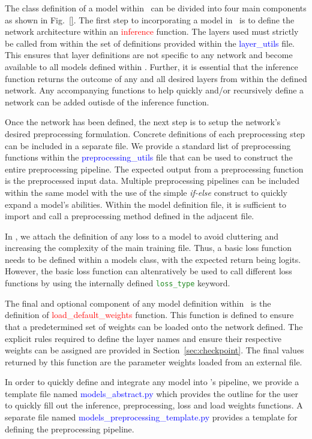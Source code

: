 \documentclass{llncs}
\begin{document}
The class definition of a model within \acro~can be divided into four main components as shown in Fig.~\ref{}. 
The first step to incorporating a model in \acro~is to define the network architecture within an \textcolor{red}{inference} function.
The layers used must strictly be called from within the set of definitions provided within the \textcolor{blue}{layer\_utils} file.
This ensures that layer definitions are not specific to any network and become available to all models defined within \acro.
Further, it is essential that the inference function returns the outcome of any and all desired layers from within the defined network.
Any accompanying functions to help quickly and/or recursively define a network can be added outisde of the inference function.

Once the network has been defined, the next step is to setup the network's desired preprocessing formulation.
Concrete definitions of each preprocessing step can be included in a separate file.
We provide a standard list of preprocessing functions within the \textcolor{blue}{preprocessing\_utils} file that can be used to construct the entire preprocessing pipeline.
The expected output from a preprocessing function is the preprocessed input data.
Multiple preprocessing pipelines can be included within the same model with the use of the simple \textit{if-else} construct to quickly expand a model's abilities. 
Within the model definition file, it is sufficient to import and call a preprocessing method defined in the adjacent file.

In \acro, we attach the definition of any loss to a model to avoid cluttering and increasing the complexity of the main training file.
Thus, a basic loss function needs to be defined within a models class, with the expected return being logits.
However, the basic loss function can altenratively be used to call different loss functions by using the internally defined \texttt{\textcolor{ForestGreen}{loss\_type}} keyword.

The final and optional component of any model definition within \acro~is the definition of \textcolor{red}{load\_default\_weights} function.
This function is defined to ensure that a predetermined set of weights can be loaded onto the network defined.
The explicit rules required to define the layer names and ensure their respective weights can be assigned are provided in Section~\ref{sec:checkpoint}.
The final values returned by this function are the parameter weights loaded from an external file. 

In order to quickly define and integrate any model into \acro's pipeline, we provide a template file named \textcolor{blue}{models\_abstract.py} which provides the outline for the user to quickly fill out the inference, preprocessing, loss and load weights functions.
A separate file named \textcolor{blue}{models\_preprocessing\_template.py} provides a template for defining the preprocessing pipeline.
\end{document}

